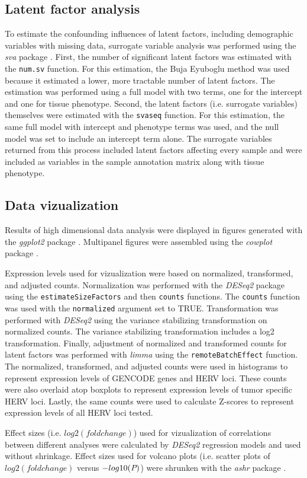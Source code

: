\subsection*{Latent factor analysis}
To estimate the confounding influences of latent factors, including demographic variables with missing data, surrogate variable analysis was performed using the \emph{sva} package \citep{sva}.
First, the number of significant latent factors was estimated with the \verb|num.sv| function.
For this estimation, the Buja Eyuboglu method was used because it estimated a lower, more tractable number of latent factors.
The estimation was performed using a full model with two terms, one for the intercept and one for tissue phenotype.
Second, the latent factors (i.e. surrogate variables) themselves were estimated with the \verb|svaseq| function.
For this estimation, the same full model with intercept and phenotype terms was used, and the null model was set to include an intercept term alone.
The surrogate variables returned from this process included latent factors affecting every sample and were included as variables in the sample annotation matrix along with tissue phenotype.

\subsection*{Data vizualization}
Results of high dimensional data analysis were displayed in figures generated with the \emph{ggplot2} package \citep{Wickham2016}.
Multipanel figures were assembled using the \emph{cowplot} package \cite{Wilke2020}.

Expression levels used for vizualization were based on normalized, transformed, and adjusted counts.
Normalization was performed with the \emph{DESeq2} package \citep{Love2014} using the \verb|estimateSizeFactors| and then \verb|counts| functions.
The \verb|counts| function was used with the \verb|normalized| argument set to TRUE.
Transformation was performed with \emph{DESeq2} using the variance stabilizing transformation on normalized counts.
The variance stabilizing transformation includes a log2 transformation.
Finally, adjustment of normalized and transformed counts for latent factors was performed with \emph{limma} using the \verb|remoteBatchEffect| function.
The normalized, transformed, and adjusted counts were used in histograms to represent expression levels of GENCODE genes and HERV loci.
These counts were also overlaid atop boxplots to represent expression levels of tumor specific HERV loci.
Lastly, the same counts were used to calculate Z-scores to represent expression levels of all HERV loci tested.

Effect sizes (i.e. $log2(fold change)$) used for vizualization of correlations between different analyses were calculated by \emph{DESeq2} regression models and used without shrinkage.
Effect sizes used for volcano plots (i.e. scatter plots of $log2(fold change)$ versus $-log10(\emph{P})$) were shrunken with the \emph{ashr} package \citep{Stephens2020}.

